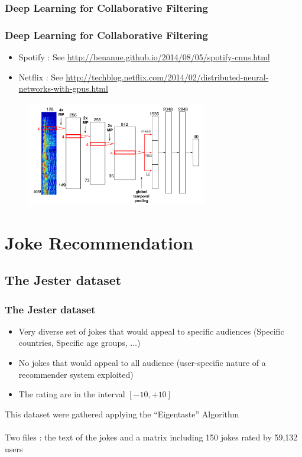\documentclass[10pt,handout,english]{beamer}
\begin{document}
			\subsubsection{Deep Learning for Collaborative Filtering}
			\begin{frame}
			\frametitle{Deep Learning for Collaborative Filtering}
				\begin{itemize}
					\item Spotify : See \url{http://benanne.github.io/2014/08/05/spotify-cnns.html}
					\item Netflix : See \url{http://techblog.netflix.com/2014/02/distributed-neural-networks-with-gpus.html}
				\end{itemize}
            	\begin{figure}[h!]
	            	\centering
	                \includegraphics[width=0.7\textwidth]{spotify_convnet.png}
	            \end{figure}
			\end{frame}

	\section{Joke Recommendation}
		\subsection{The Jester dataset}
			\begin{frame}
			\frametitle{The Jester dataset}
			\begin{itemize}
				\item Very diverse set of jokes that would appeal to specific audiences (Specific countries, Specific age groups, $\ldots$)
				\item No jokes that would appeal to all audience (user-specific nature of a recommender system exploited)
				\item The rating are in the interval $[-10, +10]$
			\end{itemize}
			This dataset were gathered applying the ``Eigentaste'' Algorithm\\~\\
			Two files : the text of the jokes and a matrix including 150 jokes rated by 59,132 users

			\end{frame}
\end{document}
